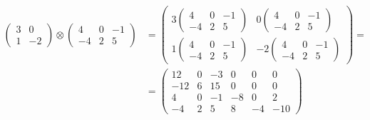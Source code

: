\begin{example}
\begin{align*} 
\begin{pmatrix}
3 & 0 \\
1 & -2
\end{pmatrix}
\otimes
\begin{pmatrix}
4 & 0 & -1 \\
-4 & 2 & 5 
\end{pmatrix} 
&=
\begin{pmatrix}
3 \begin{pmatrix}
4 & 0 & -1 \\
-4 & 2 & 5 
\end{pmatrix} & 0 \begin{pmatrix}
4 & 0 & -1 \\
-4 & 2 & 5 
\end{pmatrix} \\
1 \begin{pmatrix}
4 & 0 & -1 \\
-4 & 2 & 5 
\end{pmatrix} & -2 \begin{pmatrix}
4 & 0 & -1 \\
-4 & 2 & 5 
\end{pmatrix}
\end{pmatrix} = \\
&=
\begin{pmatrix}
12 & 0 & -3 & 0 & 0 & 0 \\
-12 & 6 & 15 & 0 & 0 & 0 \\
4 & 0 & -1 & -8 & 0 & 2 \\
-4 & 2 & 5 & 8 & -4 & -10
\end{pmatrix}
\end{align*}
\end{example}

